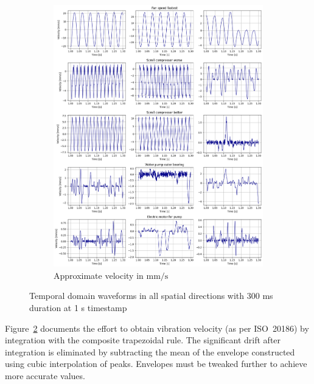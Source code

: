 \begin{figure}[h]
\begin{subfigure}[b]{0.49\textwidth}
        \includegraphics[width=\textwidth]{assets/design/EDA-custom-dataset-velocity.png}
        \caption{Approximate velocity in $\mathrm{mm/s}$}
        \label{fig:design:preliminary-velocity}
    \end{subfigure} 
    \caption{Temporal domain waveforms in all spatial directions with 300 ms duration at 1 s timestamp}
\end{figure} 

Figure~\ref{fig:design:preliminary-velocity} documents the effort to obtain vibration velocity (as per ISO~20186) by integration with the composite trapezoidal rule. The significant drift after integration is eliminated by subtracting the mean of the envelope constructed using cubic interpolation of peaks. Envelopes must be tweaked further to achieve more accurate values.

